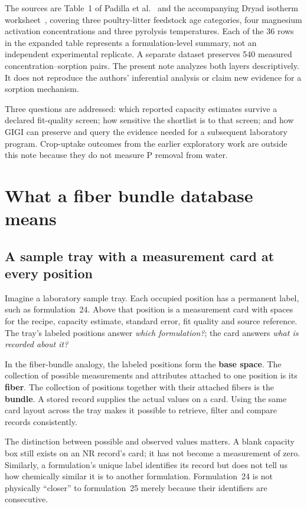 \documentclass[11pt,letterpaper]{article}
\begin{document}
The sources are Table~1 of Padilla et al.~\cite{padilla} and the accompanying Dryad isotherm worksheet~\cite{dryad}, covering three poultry-litter feedstock age categories, four magnesium activation concentrations and three pyrolysis temperatures. Each of the 36 rows in the expanded table represents a formulation-level summary, not an independent experimental replicate. A separate dataset preserves 540 measured concentration--sorption pairs. The present note analyzes both layers descriptively. It does not reproduce the authors' inferential analysis or claim new evidence for a sorption mechanism.

Three questions are addressed: which reported capacity estimates survive a declared fit-quality screen; how sensitive the shortlist is to that screen; and how GIGI can preserve and query the evidence needed for a subsequent laboratory program. Crop-uptake outcomes from the earlier exploratory work are outside this note because they do not measure P removal from water.

\section{What a fiber bundle database means}
\subsection{A sample tray with a measurement card at every position}
Imagine a laboratory sample tray. Each occupied position has a permanent label, such as formulation~24. Above that position is a measurement card with spaces for the recipe, capacity estimate, standard error, fit quality and source reference. The tray's labeled positions answer \emph{which formulation?}; the card answers \emph{what is recorded about it?}

In the fiber-bundle analogy, the labeled positions form the \textbf{base space}. The collection of possible measurements and attributes attached to one position is its \textbf{fiber}. The collection of positions together with their attached fibers is the \textbf{bundle}. A stored record supplies the actual values on a card. Using the same card layout across the tray makes it possible to retrieve, filter and compare records consistently.

The distinction between possible and observed values matters. A blank capacity box still exists on an NR record's card; it has not become a measurement of zero. Similarly, a formulation's unique label identifies its record but does not tell us how chemically similar it is to another formulation. Formulation~24 is not physically ``closer'' to formulation~25 merely because their identifiers are consecutive.
\end{document}

